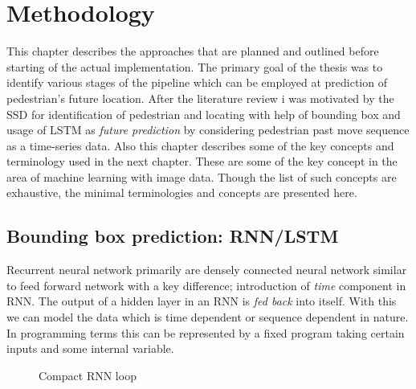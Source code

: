 
\chapter{Methodology}
This chapter describes the approaches that are planned and outlined before starting of the actual implementation. The primary goal of the thesis was to identify various stages of the pipeline which can be employed at prediction of pedestrian's future location. After the literature review i was motivated by the SSD for identification of pedestrian and locating with help of bounding box and usage of LSTM as \textit{future prediction} by considering pedestrian past move sequence as a time-series data. Also this chapter describes some of the key concepts and terminology used in the next chapter. These are some of the key concept in the area of machine learning with image data. Though the list of such concepts are exhaustive, the minimal terminologies and concepts are presented here.


\section{Bounding box prediction: RNN/LSTM}
Recurrent neural network primarily are densely connected neural network similar to feed forward network with a key difference; introduction of \textit{time} component in RNN. The output of a hidden layer in an RNN is \textit{fed back } into itself. With this we can model the data which is time dependent or sequence dependent in nature. In programming terms this can be represented by a fixed program taking certain inputs and some internal variable.

\begin{figure}[H]
\begin{center}
\caption{Compact RNN loop}
\end{center}
\end{figure}


